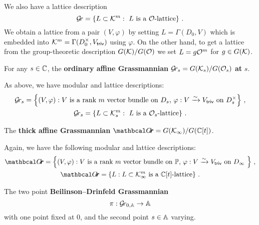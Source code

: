 \documentclass[draft]{article}
\begin{document}
We also have a lattice description 
$$ 
\Gr = 
    \left\{ L \subset \cK^m : \text{ $L$ is a $\cO$-lattice} \right\}\,.
$$
% 
We obtain a lattice from a pair $ (V,\varphi) $ by setting $ L = \Gamma(D_0, V)$ which is embedded into $ \cK^m = \Gamma(D_0^\times, \Vtriv)$ using $ \varphi$.  
On the other hand, to get a lattice from the group-theoretic description $ G(\cK) / G(\cO) $ we set $ L = g \cO^m$ for $ g \in G(\cK)$.
% 
\begin{definition}
\label{def:grs}
 For any $ s \in \CC $, 
    the \textbf{ordinary affine Grassmannian} $\Gr_s = G(\cK_s)/G(\cO_s)$ \textbf{at} $ s $. 
\end{definition}    
As above, we have modular and lattice descriptions:
\begin{gather*}
\Gr_s = 
    \left\{ (
        V, \varphi) : \text{$V$ is a rank $m$ vector bundle on $ D_s $, $\varphi : V \xrightarrow{\sim} \Vtriv $ on $ D^\times_s $} 
    \right\}\,, \\
\Gr_s = 
    \left\{ 
        L \subset \cK_s^m : \text{ $L$ is a $\cO_s$-lattice} 
    \right\} \,. 
\end{gather*}
% 
% 
\begin{definition}
\label{def:grth}
The \textbf{thick affine Grassmannian} $\Grth = G(\Kinf)/G(\CC[t])$.
\end{definition}
Again, we have the following modular and lattice descriptions:
\begin{gather*}
\Grth = 
    \left\{ 
        (V, \varphi) : \text{$V$ is a rank $m$ vector bundle on $ \PP $, $\varphi : V \xrightarrow{\sim} \Vtriv $ on $ D_\infty $ } 
    \right\}\,, \\
\Grth = 
    \left\{ 
        L : L \subset  \Kinf^m \text{ is a $\CC[t]$-lattice} 
    \right\}\,.
\end{gather*}
% 
\begin{definition} 
\label{def:bdgr}
The two point \textbf{Beilinson--Drinfeld Grassmannian} $$\pi : \Grbd\to \AA$$ with one point fixed at 0, and the second point $s\in\AA$ varying.
\end{definition}
\end{document}
